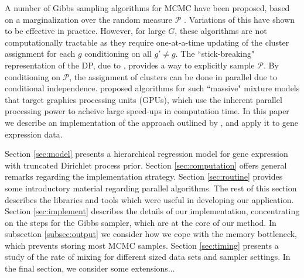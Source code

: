 A number of Gibbs sampling algorithms for MCMC have been proposed, based on a marginalization over the random measure $\mathcal{P}$ \citep{neal2000}. Variations of this have shown to be effective in practice. However, for large $G$, these algorithms are not computationally tractable as they require one-at-a-time updating of the cluster assignment for each $g$ conditioning on all $g'\neq g$. The ``stick-breaking" representation of the DP, due to \citet{sethuraman}, provides a way to explicitly sample $\mathcal{P}$. By conditioning on $\mathcal{P}$, the assignment of clusters can be done in parallel due to conditional independence. \citet{suchard} proposed algorithms for such ``massive" mixture models that target graphics processing units (GPUs), which use the inherent parallel processing power to acheive large speed-ups in computation time. In this paper we describe an implementation of the approach outlined by \citet{suchard}, and apply it to gene expression data.

Section \ref{sec:model} presents a hierarchical regression model for gene expression with truncated Dirichlet process prior. Section \ref{sec:computation} offers general remarks regarding the implementation strategy. Section \ref{sec:routine} provides some introductory material regarding parallel algorithms. The rest of this section describes the libraries and tools which were useful in developing our application. Section \ref{sec:implement} describes the details of our implementation, concentrating on the steps for the Gibbs sampler, which are at the core of our method. In subsection \ref{subsec:output} we consider how we cope with the memory bottleneck, which prevents storing most MCMC samples. Section \ref{sec:timing} presents a study of the rate of mixing for different sized data sets and sampler settings. In the final section, we consider some extensions...


